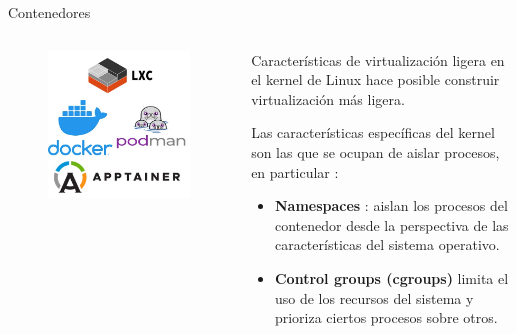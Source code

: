 \documentclass[11pt]{beamer}
\begin{document}
\begin{frame}{Contenedores}
	\begin{columns}
\begin{column}{0.5\textwidth}

  \begin{figure}
  	\includegraphics[scale=0.3]{images/contenedores_tecnologias}
  \end{figure}
\end{column}

	\vspace{-0.5cm}

\begin{column}{0.5\textwidth}  %
	
	Características de virtualización ligera en el kernel de Linux hace posible construir virtualización más ligera. 

	\vspace{0.2cm}
	
	Las características específicas del kernel son las que se ocupan de aislar procesos, en particular \citep{nemeth2018unix}:
	
		\begin{itemize}
			\item \textbf{Namespaces} : aislan los procesos del contenedor desde la perspectiva de las características del sistema operativo.
			\item \textbf{Control groups (cgroups)} limita el uso de los recursos del sistema y prioriza ciertos procesos sobre otros.
					\end{itemize}

	
\end{column}
\end{columns}
\end{frame}
\end{document}
